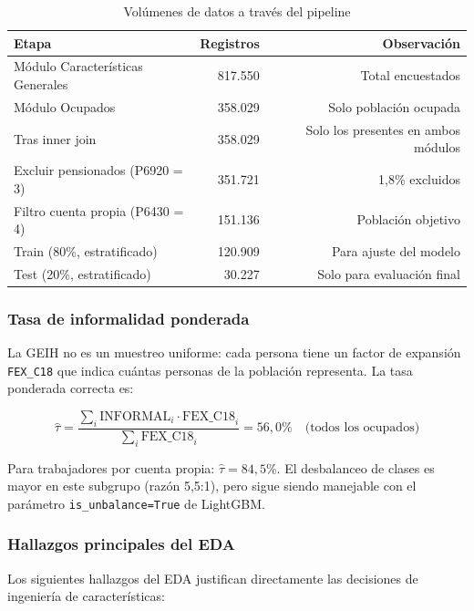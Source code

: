 \documentclass[12pt, a4paper]{article}
\begin{document}
\begin{table}[H]
\centering
\caption{Volúmenes de datos a través del pipeline}
\label{tab:volumenes}
\begin{tabular}{lrr}
\toprule
\textbf{Etapa} & \textbf{Registros} & \textbf{Observación} \\
\midrule
Módulo Características Generales & 817.550 & Total encuestados \\
Módulo Ocupados & 358.029 & Solo población ocupada \\
Tras inner join & 358.029 & Solo los presentes en ambos módulos \\
Excluir pensionados (P6920 = 3) & 351.721 & 1{,}8\% excluidos \\
Filtro cuenta propia (P6430 = 4) & 151.136 & Población objetivo \\
Train (80\%, estratificado) & 120.909 & Para ajuste del modelo \\
Test (20\%, estratificado) & 30.227 & Solo para evaluación final \\
\bottomrule
\end{tabular}
\end{table}

\subsubsection{Tasa de informalidad ponderada}

La GEIH no es un muestreo uniforme: cada persona tiene un factor de expansión
\texttt{FEX\_C18} que indica cuántas personas de la población representa. La tasa
ponderada correcta es:

\begin{equation}
  \hat{\tau} = \frac{\sum_i \text{INFORMAL}_i \cdot \text{FEX\_C18}_i}
                    {\sum_i \text{FEX\_C18}_i} = 56{,}0\%
  \quad \text{(todos los ocupados)}
\end{equation}

Para trabajadores por cuenta propia: $\hat{\tau} = 84{,}5\%$. El desbalanceo de clases
es mayor en este subgrupo (razón 5{,}5:1), pero sigue siendo manejable con el parámetro
\texttt{is\_unbalance=True} de LightGBM.

\subsubsection{Hallazgos principales del EDA}

Los siguientes hallazgos del EDA justifican directamente las decisiones de ingeniería
de características:
\end{document}

